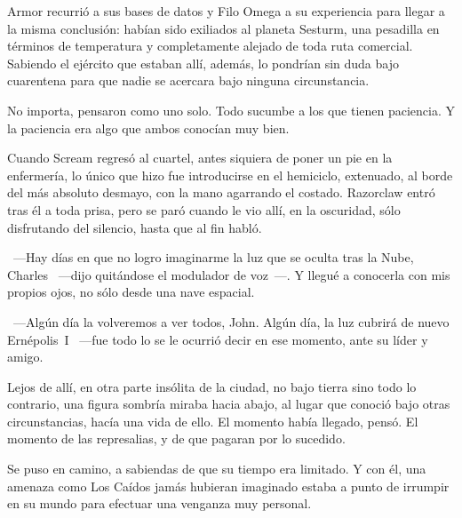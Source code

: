 Armor recurrió a sus bases de datos y Filo Omega a su experiencia para llegar a la misma conclusión: habían sido exiliados al planeta Sesturm, una pesadilla en términos de temperatura y completamente alejado de toda ruta comercial. Sabiendo el ejército que estaban allí, además, lo pondrían sin duda bajo cuarentena para que nadie se acercara bajo ninguna circunstancia.

No importa, pensaron como uno solo. Todo sucumbe a los que tienen paciencia. Y la paciencia era algo que ambos conocían muy bien.

\parbreak
Cuando Scream regresó al cuartel, antes siquiera de poner un pie en la enfermería, lo único que hizo fue introducirse en el hemiciclo, extenuado, al borde del más absoluto desmayo, con la mano agarrando el costado. Razorclaw entró tras él a toda prisa, pero se paró cuando le vio allí, en la oscuridad, sólo disfrutando del silencio, hasta que al fin habló.

~---Hay días en que no logro imaginarme la luz que se oculta tras la Nube, Charles ~---dijo quitándose el modulador de voz~---. Y llegué a conocerla con mis propios ojos, no sólo desde una nave espacial.

~---Algún día la volveremos a ver todos, John. Algún día, la luz cubrirá de nuevo Ernépolis~I ~---fue todo lo se le ocurrió decir en ese momento, ante su líder y amigo.

\parbreak
Lejos de allí, en otra parte insólita de la ciudad, no bajo tierra sino todo lo contrario, una figura sombría miraba hacia abajo, al lugar que conoció bajo otras circunstancias, hacía una vida de ello. El momento había llegado, pensó. El momento de las represalias, y de que pagaran por lo sucedido.

Se puso en camino, a sabiendas de que su tiempo era limitado. Y con él, una amenaza como Los Caídos jamás hubieran imaginado estaba a punto de irrumpir en su mundo para efectuar una venganza muy personal.

\endinput
